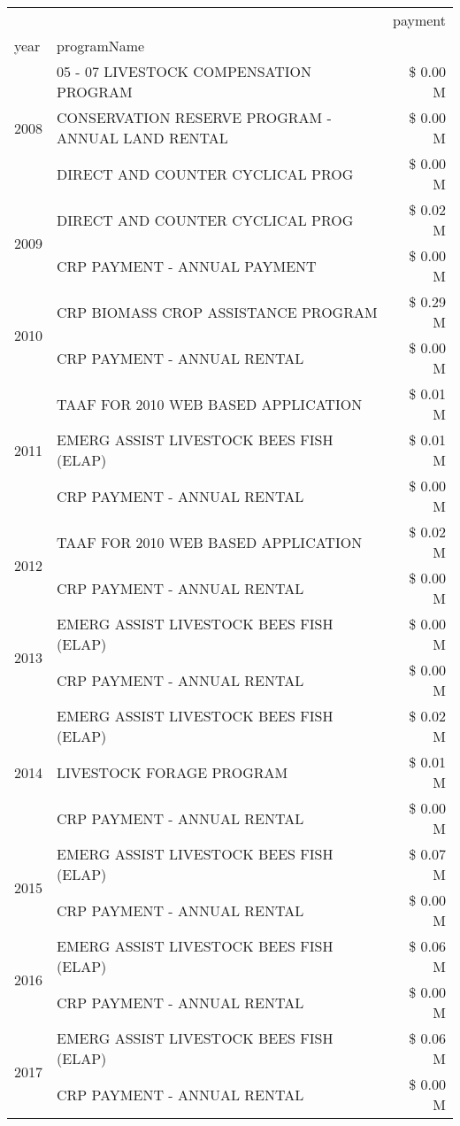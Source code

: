 \begin{tabular}{llr}
\toprule
 &  & payment \\
year & programName &  \\
\midrule
\multirow[t]{3}{*}{2008} & 05 - 07 LIVESTOCK COMPENSATION PROGRAM & \$ 0.00 M \\
 & CONSERVATION RESERVE PROGRAM - ANNUAL LAND RENTAL & \$ 0.00 M \\
 & DIRECT AND COUNTER CYCLICAL PROG & \$ 0.00 M \\
\cline{1-3}
\multirow[t]{2}{*}{2009} & DIRECT AND COUNTER CYCLICAL PROG & \$ 0.02 M \\
 & CRP PAYMENT - ANNUAL PAYMENT & \$ 0.00 M \\
\cline{1-3}
\multirow[t]{2}{*}{2010} & CRP BIOMASS CROP ASSISTANCE PROGRAM & \$ 0.29 M \\
 & CRP PAYMENT - ANNUAL RENTAL & \$ 0.00 M \\
\cline{1-3}
\multirow[t]{3}{*}{2011} & TAAF FOR 2010 WEB BASED APPLICATION & \$ 0.01 M \\
 & EMERG ASSIST LIVESTOCK BEES FISH (ELAP) & \$ 0.01 M \\
 & CRP PAYMENT - ANNUAL RENTAL & \$ 0.00 M \\
\cline{1-3}
\multirow[t]{2}{*}{2012} & TAAF FOR 2010 WEB BASED APPLICATION & \$ 0.02 M \\
 & CRP PAYMENT - ANNUAL RENTAL & \$ 0.00 M \\
\cline{1-3}
\multirow[t]{2}{*}{2013} & EMERG ASSIST LIVESTOCK BEES FISH (ELAP) & \$ 0.00 M \\
 & CRP PAYMENT - ANNUAL RENTAL & \$ 0.00 M \\
\cline{1-3}
\multirow[t]{3}{*}{2014} & EMERG ASSIST LIVESTOCK BEES FISH (ELAP) & \$ 0.02 M \\
 & LIVESTOCK FORAGE PROGRAM & \$ 0.01 M \\
 & CRP PAYMENT - ANNUAL RENTAL & \$ 0.00 M \\
\cline{1-3}
\multirow[t]{2}{*}{2015} & EMERG ASSIST LIVESTOCK BEES FISH (ELAP) & \$ 0.07 M \\
 & CRP PAYMENT - ANNUAL RENTAL & \$ 0.00 M \\
\cline{1-3}
\multirow[t]{2}{*}{2016} & EMERG ASSIST LIVESTOCK BEES FISH (ELAP) & \$ 0.06 M \\
 & CRP PAYMENT - ANNUAL RENTAL & \$ 0.00 M \\
\cline{1-3}
\multirow[t]{2}{*}{2017} & EMERG ASSIST LIVESTOCK BEES FISH (ELAP) & \$ 0.06 M \\
 & CRP PAYMENT - ANNUAL RENTAL & \$ 0.00 M \\

\end{tabular}
